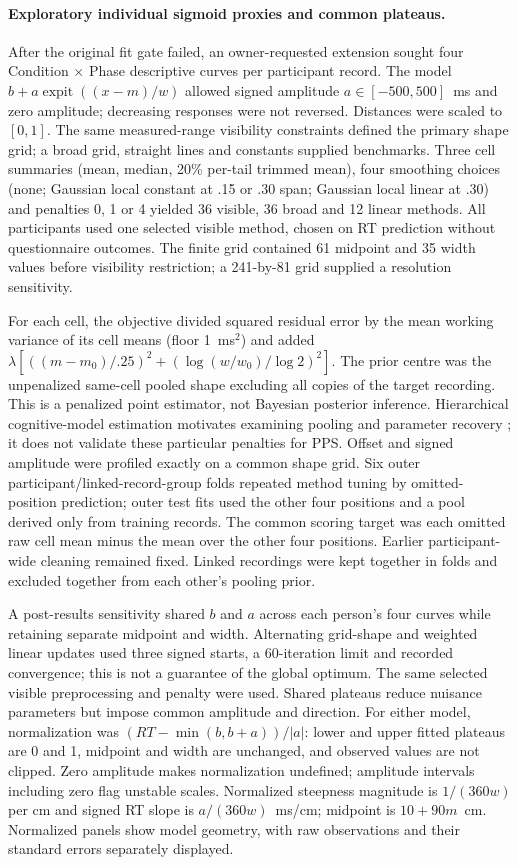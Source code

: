 \paragraph{Exploratory individual sigmoid proxies and common plateaus.}
After the original fit gate failed, an owner-requested extension sought four Condition $\times$ Phase descriptive curves per participant record. The model $b+a\operatorname{expit}((x-m)/w)$ allowed signed amplitude $a\in[-500,500]$~ms and zero amplitude; decreasing responses were not reversed. Distances were scaled to $[0,1]$. The same measured-range visibility constraints defined the primary shape grid; a broad grid, straight lines and constants supplied benchmarks. Three cell summaries (mean, median, 20\% per-tail trimmed mean), four smoothing choices (none; Gaussian local constant at .15 or .30 span; Gaussian local linear at .30) and penalties 0, 1 or 4 yielded 36 visible, 36 broad and 12 linear methods. All participants used one selected visible method, chosen on RT prediction without questionnaire outcomes. The finite grid contained 61 midpoint and 35 width values before visibility restriction; a 241-by-81 grid supplied a resolution sensitivity.

For each cell, the objective divided squared residual error by the mean working variance of its cell means (floor 1~ms$^2$) and added $\lambda[((m-m_0)/.25)^2+(\log(w/w_0)/\log 2)^2]$. The prior centre was the unpenalized same-cell pooled shape excluding all copies of the target recording. This is a penalized point estimator, not Bayesian posterior inference. Hierarchical cognitive-model estimation motivates examining pooling and parameter recovery \citep{Ahn2011}; it does not validate these particular penalties for PPS. Offset and signed amplitude were profiled exactly on a common shape grid. Six outer participant/linked-record-group folds repeated method tuning by omitted-position prediction; outer test fits used the other four positions and a pool derived only from training records. The common scoring target was each omitted raw cell mean minus the mean over the other four positions. Earlier participant-wide cleaning remained fixed. Linked recordings were kept together in folds and excluded together from each other's pooling prior.

A post-results sensitivity shared $b$ and $a$ across each person's four curves while retaining separate midpoint and width. Alternating grid-shape and weighted linear updates used three signed starts, a 60-iteration limit and recorded convergence; this is not a guarantee of the global optimum. The same selected visible preprocessing and penalty were used. Shared plateaus reduce nuisance parameters but impose common amplitude and direction. For either model, normalization was $(RT-\min(b,b+a))/|a|$: lower and upper fitted plateaus are 0 and 1, midpoint and width are unchanged, and observed values are not clipped. Zero amplitude makes normalization undefined; amplitude intervals including zero flag unstable scales. Normalized steepness magnitude is $1/(360w)$ per cm and signed RT slope is $a/(360w)$~ms/cm; midpoint is $10+90m$~cm. Normalized panels show model geometry, with raw observations and their standard errors separately displayed.

